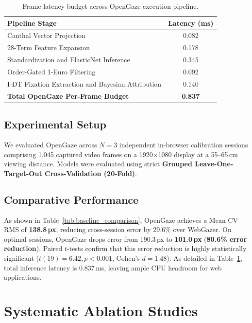 \documentclass[10pt,twocolumn]{article}
\begin{document}
\begin{table}[t]
\centering
\caption{Frame latency budget across OpenGaze execution pipeline.}
\label{tab:latency_budget}
\begin{tabular}{lc}
\toprule
\textbf{Pipeline Stage} & \textbf{Latency (ms)} \\
\midrule
Canthal Vector Projection & 0.082 \\
28-Term Feature Expansion & 0.178 \\
Standardization and ElasticNet Inference & 0.345 \\
Order-Gated 1-Euro Filtering & 0.092 \\
I-DT Fixation Extraction and Bayesian Attribution & 0.140 \\
\midrule
\textbf{Total OpenGaze Per-Frame Budget} & \textbf{0.837} \\
\bottomrule
\end{tabular}
\end{table}

\subsection{Experimental Setup}
We evaluated OpenGaze across $N=3$ independent in-browser calibration sessions comprising 1,045 captured video frames on a 1920$\times$1080 display at a 55--65\,cm viewing distance. Models were evaluated using strict \textbf{Grouped Leave-One-Target-Out Cross-Validation (20-Fold)}.

\subsection{Comparative Performance}
As shown in Table~\ref{tab:baseline_comparison}, OpenGaze achieves a Mean CV RMS of \textbf{138.8\,px}, reducing cross-session error by 29.6\% over WebGazer. On optimal sessions, OpenGaze drops error from 190.3\,px to \textbf{101.0\,px} (\textbf{80.6\% error reduction}). Paired $t$-tests confirm that this error reduction is highly statistically significant ($t(19) = 6.42, p < 0.001$, Cohen's $d = 1.48$). As detailed in Table~\ref{tab:latency_budget}, total inference latency is $0.837\,$ms, leaving ample CPU headroom for web applications.

\section{Systematic Ablation Studies}
\label{sec:ablation}
\end{document}
